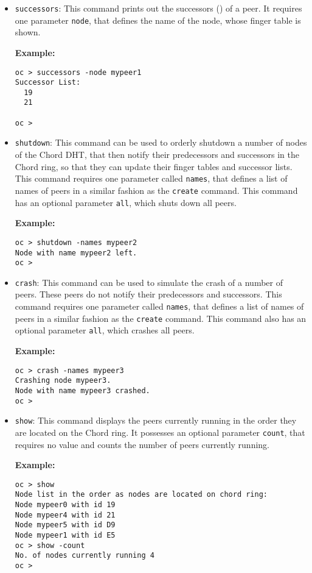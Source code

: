 \begin{itemize}
{\bf Example:}
\begin{verbatim}
oc > refs -node mypeer3
Retrieving node mypeer3
Finger table:
  E5 (0-155)
  19 (156-157)
  21 (158)
  BE (159)

oc >
\end{verbatim}
This command prints the identifier of a peer in the finger table and 
behind an identifier a range of numbers. 
This range represents the indexes the node with that identifier has in 
the finger table.
%
\item {\tt successors}: This command prints out the successors 
(\cite{stoica01chord}) of a peer. It requires one parameter 
{\tt node}, that defines the name of the node, whose finger table 
is shown. 

{\bf Example:}
\begin{verbatim}
oc > successors -node mypeer1
Successor List:
  19
  21

oc >
\end{verbatim}
%
\item {\tt shutdown}: This command can be used to orderly shutdown 
a number of nodes of the Chord DHT, that then notify their predecessors and 
successors in the Chord ring, so that they can update their finger 
tables and successor lists. This command requires one parameter 
called {\tt names}, that defines a list of names of peers in a similar 
fashion as the {\tt create} command. This command has an optional 
parameter {\tt all}, which shuts down all peers. 

{\bf Example:}
\begin{verbatim}
oc > shutdown -names mypeer2
Node with name mypeer2 left.
oc >
\end{verbatim}
%
\item {\tt crash}: This command can be used to simulate the crash 
of a number of peers. These peers do not notify their predecessors
and successors. This command requires one parameter 
called {\tt names}, that defines a list of names of peers in a similar 
fashion as the {\tt create} command. This command also has an optional 
parameter {\tt all}, which crashes all peers. 

{\bf Example:}
\begin{verbatim}
oc > crash -names mypeer3
Crashing node mypeer3.
Node with name mypeer3 crashed.
oc >
\end{verbatim}
%
\item {\tt show}: This command displays the peers currently running 
in the order they are located on the Chord ring. It possesses an optional 
parameter {\tt count}, that requires no value and counts the 
number of peers currently running. 

{\bf Example:}
\begin{verbatim}
oc > show
Node list in the order as nodes are located on chord ring:
Node mypeer0 with id 19
Node mypeer4 with id 21
Node mypeer5 with id D9
Node mypeer1 with id E5
oc > show -count
No. of nodes currently running 4
oc > 
\end{verbatim}
\end{itemize}

